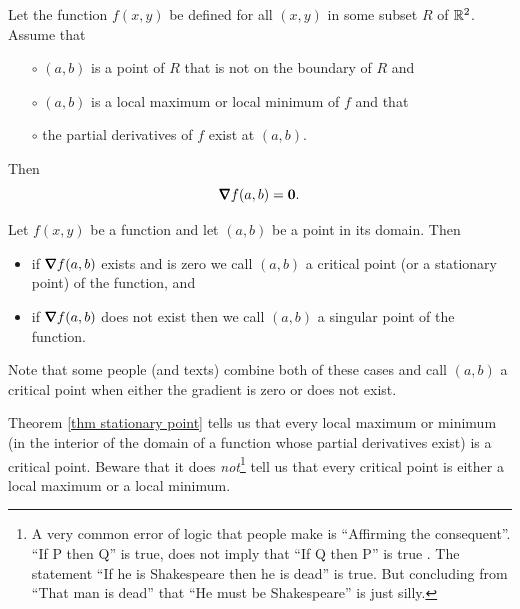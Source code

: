 \begin{theorem}\label{thm stationary point}
Let the function $f(x,y)$ be defined for all $(x,y)$ in some subset $R$ 
of $\mathbb{R}^2$. Assume that
\begin{itemize}\itemsep1pt \parskip0pt 
\item[$\circ$]
$(a,b)$ is a point of $R$ that is not on the boundary of $R$ and
\item[$\circ$]
$(a,b)$ is a local maximum or local minimum of $f$ and that
\item[$\circ$]
the partial derivatives of $f$ exist at $(a,b)$.
\end{itemize}
Then
\begin{equation*}
\vnabla f(a,b) = \vZero.
\end{equation*}
\end{theorem}

\begin{defn}\label{def critical point} 
Let $f(x,y)$ be a function and let $(a,b)$ be a point in its domain. Then
\begin{itemize}
 \item if $\vnabla f(a,b)$ exists and is zero we call $(a,b)$ 
a critical point (or a stationary point) of the function, and
 \item if $\vnabla f(a,b)$ does not exist then we call $(a,b)$ 
a singular point of the  function.
\end{itemize}
\end{defn}

\begin{warning}\label{warn critical point} 
Note that some people (and texts) combine both of these cases and call 
$(a,b)$ a critical point when either the gradient is zero or does not exist. 
\end{warning}

\begin{warning}\label{warn saddle} 
Theorem \ref{thm stationary point} tells us that every local maximum 
or minimum (in the interior of the domain of a function whose partial derivatives exist) 
is a critical point.  Beware that it does \emph{not}\footnote{A very common 
error of logic that people make is ``Affirming the consequent''. 
``If P then Q'' is true, does not imply that ``If Q then P'' is true . 
The statement ``If he is Shakespeare then he is dead'' is true. 
But concluding from ``That man is dead'' that ``He must be Shakespeare''
is just silly. 
} 
tell us that every critical point is either a local maximum or a local minimum. 
\end{warning}


